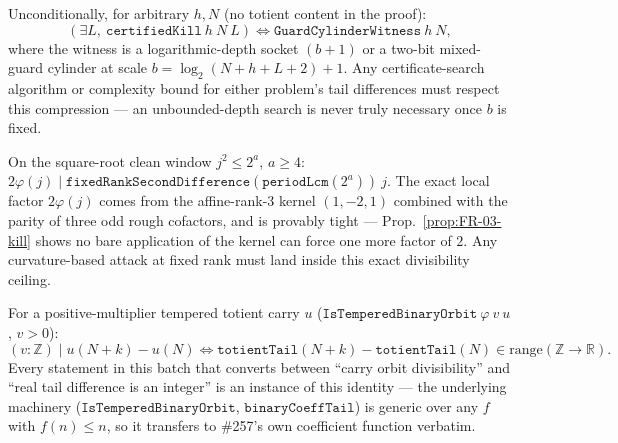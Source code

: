 \begin{prop}\label{prop:TE-03-inv}
Unconditionally, for arbitrary $h,N$ (no totient content in the proof):
\[
(\exists L,\ \mathtt{certifiedKill}\ h\ N\ L) \iff \mathtt{GuardCylinderWitness}\ h\ N,
\]
where the witness is a logarithmic-depth socket $(b{+}1)$ or a two-bit mixed-guard cylinder at
scale $b=\log_2(N{+}h{+}L{+}2){+}1$. Any certificate-search algorithm or complexity bound for
either problem's tail differences must respect this compression — an unbounded-depth search is
never truly necessary once $b$ is fixed.
\ \ \\
\end{prop}

\begin{prop}\label{prop:FR-02-inv}
On the square-root clean window $j^2\le2^a$, $a\ge4$: $2\varphi(j) \mid \mathtt{fixedRankSecondDifference}(\mathtt{periodLcm}(2^a))\ j$.
The exact local factor $2\varphi(j)$ comes from the affine-rank-3 kernel $(1,-2,1)$ combined with
the parity of three odd rough cofactors, and is provably tight — Prop.~\ref{prop:FR-03-kill}
shows no bare application of the kernel can force one more factor of $2$. Any curvature-based
attack at fixed rank must land inside this exact divisibility ceiling.
\ \ \\
\end{prop}

\begin{prop}\label{prop:CP-01-inv}
For a positive-multiplier tempered totient carry $u$ ($\mathtt{IsTemperedBinaryOrbit}\ \varphi\ v\ u$, $v>0$):
\[
(v:\mathbb Z)\mid u(N{+}k)-u(N) \iff \mathtt{totientTail}(N{+}k)-\mathtt{totientTail}(N)\in\mathrm{range}(\mathbb Z\to\mathbb R).
\]
Every statement in this batch that converts between ``carry orbit divisibility'' and ``real tail
difference is an integer'' is an instance of this identity — the underlying machinery
($\mathtt{IsTemperedBinaryOrbit}$, $\mathtt{binaryCoeffTail}$) is generic over any $f$ with
$f(n)\le n$, so it transfers to \#257's own coefficient function verbatim.
\ \ \\
\end{prop}

